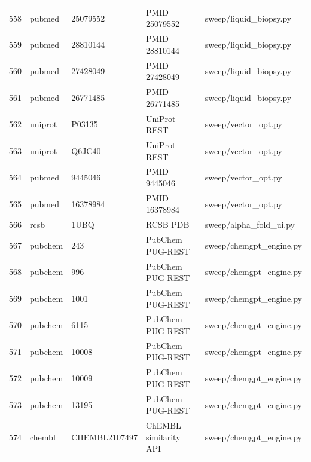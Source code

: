 {\begin{longtable}{rllp{3.2cm}p{4.2cm}}
558 & pubmed & 25079552 & PMID 25079552 & sweep/liquid\_biopsy.py\\
559 & pubmed & 28810144 & PMID 28810144 & sweep/liquid\_biopsy.py\\
560 & pubmed & 27428049 & PMID 27428049 & sweep/liquid\_biopsy.py\\
561 & pubmed & 26771485 & PMID 26771485 & sweep/liquid\_biopsy.py\\
562 & uniprot & P03135 & UniProt REST & sweep/vector\_opt.py\\
563 & uniprot & Q6JC40 & UniProt REST & sweep/vector\_opt.py\\
564 & pubmed & 9445046 & PMID 9445046 & sweep/vector\_opt.py\\
565 & pubmed & 16378984 & PMID 16378984 & sweep/vector\_opt.py\\
566 & rcsb & 1UBQ & RCSB PDB & sweep/alpha\_fold\_ui.py\\
567 & pubchem & 243 & PubChem PUG-REST & sweep/chemgpt\_engine.py\\
568 & pubchem & 996 & PubChem PUG-REST & sweep/chemgpt\_engine.py\\
569 & pubchem & 1001 & PubChem PUG-REST & sweep/chemgpt\_engine.py\\
570 & pubchem & 6115 & PubChem PUG-REST & sweep/chemgpt\_engine.py\\
571 & pubchem & 10008 & PubChem PUG-REST & sweep/chemgpt\_engine.py\\
572 & pubchem & 10009 & PubChem PUG-REST & sweep/chemgpt\_engine.py\\
573 & pubchem & 13195 & PubChem PUG-REST & sweep/chemgpt\_engine.py\\
574 & chembl & CHEMBL2107497 & ChEMBL similarity API & sweep/chemgpt\_engine.py\\
\hline\end{longtable}}
